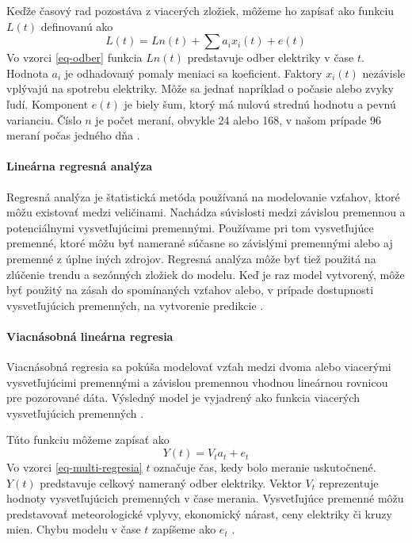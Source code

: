 \documentclass[a4paper,slovak,12pt,appendix]{article}
\begin{document}
Keďže časový rad pozostáva z viacerých zložiek, môžeme ho zapísať ako funkciu
$L(t)$ definovanú ako
\begin{equation}
  L(t) = Ln(t) + \sum a_i x_i(t) + e(t)
  \label{eq-odber}
\end{equation}
Vo vzorci \ref{eq-odber} funkcia $Ln(t)$ predstavuje odber elektriky v čase
$t$. Hodnota $a_i$ je odhadovaný pomaly meniaci sa koeficient. Faktory
$x_i(t)$ nezávisle vplývajú na spotrebu elektriky. Môže sa jednať napríklad
o počasie alebo zvyky ľudí. Komponent $e(t)$ je biely šum, ktorý má nulovú
strednú hodnotu a pevnú varianciu. Číslo $n$ je počet meraní, obvykle 24
alebo 168, v našom prípade 96 meraní počas jedného dňa \cite{KumarSingh2013}.

\paragraph{Lineárna regresná analýza}
Regresná analýza je štatistická metóda používaná na modelovanie vzťahov, ktoré
môžu existovať medzi veličinami. Nachádza súvislosti medzi závislou premennou
a potenciálnymi vysvetľujúcimi premennými. Používame pri tom vysvetľujúce
premenné, ktoré môžu byť namerané súčasne so závislými premennými alebo aj
premenné z úplne iných zdrojov. Regresná analýza môže byť tiež použitá
na zlúčenie trendu a sezónných zložiek do modelu. Keď je raz model vytvorený,
môže byť použitý na zásah do spomínaných vzťahov alebo, v prípade  dostupnosti
vysvetľujúcich premenných, na vytvorenie predikcie \cite{Liu1992}.

\paragraph{Viacnásobná lineárna regresia}
Viacnásobná regresia sa pokúša modelovať vzťah medzi dvoma alebo viacerými
vysvetľujúcimi premennými a závislou premennou vhodnou lineárnou rovnicou pre
pozorované dáta. Výsledný model je vyjadrený ako funkcia viacerých
vysvetľujúcich premenných \cite{Grmanova2016}.

Túto funkciu môžeme zapísať ako
\begin{equation}
  Y(t) = V_t a_t + e_t
  \label{eq-multi-regresia}
\end{equation}
Vo vzorci \ref{eq-multi-regresia} $t$ označuje čas, kedy bolo meranie
uskutočnené. $Y(t)$ predstavuje celkový nameraný odber elektriky. Vektor $V_t$
reprezentuje hodnoty vysvetľujúcich premenných v čase merania. Vysvetľujúce
premenné môžu predstavovať meteorologické vplyvy, ekonomický nárast, ceny
elektriky či kruzy mien. Chybu modelu v čase $t$ zapíšeme
ako $e_t$ \cite{KumarSingh2013}.
\end{document}

